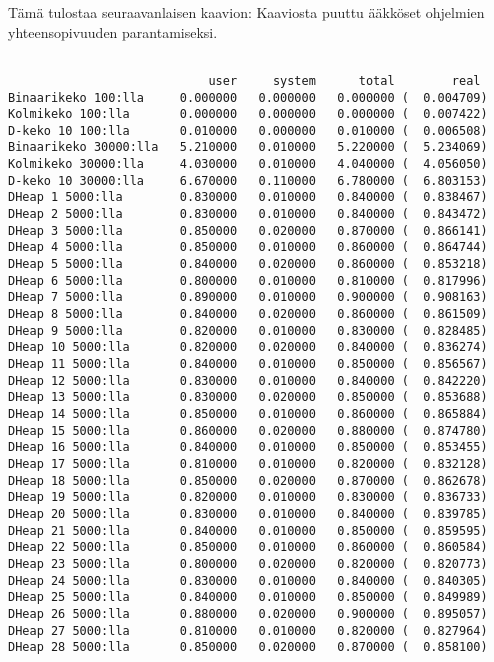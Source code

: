 \documentclass[a4paper,12pt]{article}
\begin{document}
Tämä tulostaa seuraavanlaisen kaavion:
Kaaviosta puuttu ääkköset ohjelmien yhteensopivuuden parantamiseksi.
\newpage
\scriptsize
\begin{verbatim}

                            user     system      total        real
Binaarikeko 100:lla     0.000000   0.000000   0.000000 (  0.004709)
Kolmikeko 100:lla       0.000000   0.000000   0.000000 (  0.007422)
D-keko 10 100:lla       0.010000   0.000000   0.010000 (  0.006508)
Binaarikeko 30000:lla   5.210000   0.010000   5.220000 (  5.234069)
Kolmikeko 30000:lla     4.030000   0.010000   4.040000 (  4.056050)
D-keko 10 30000:lla     6.670000   0.110000   6.780000 (  6.803153)
DHeap 1 5000:lla        0.830000   0.010000   0.840000 (  0.838467)
DHeap 2 5000:lla        0.830000   0.010000   0.840000 (  0.843472)
DHeap 3 5000:lla        0.850000   0.020000   0.870000 (  0.866141)
DHeap 4 5000:lla        0.850000   0.010000   0.860000 (  0.864744)
DHeap 5 5000:lla        0.840000   0.020000   0.860000 (  0.853218)
DHeap 6 5000:lla        0.800000   0.010000   0.810000 (  0.817996)
DHeap 7 5000:lla        0.890000   0.010000   0.900000 (  0.908163)
DHeap 8 5000:lla        0.840000   0.020000   0.860000 (  0.861509)
DHeap 9 5000:lla        0.820000   0.010000   0.830000 (  0.828485)
DHeap 10 5000:lla       0.820000   0.020000   0.840000 (  0.836274)
DHeap 11 5000:lla       0.840000   0.010000   0.850000 (  0.856567)
DHeap 12 5000:lla       0.830000   0.010000   0.840000 (  0.842220)
DHeap 13 5000:lla       0.830000   0.020000   0.850000 (  0.853688)
DHeap 14 5000:lla       0.850000   0.010000   0.860000 (  0.865884)
DHeap 15 5000:lla       0.860000   0.020000   0.880000 (  0.874780)
DHeap 16 5000:lla       0.840000   0.010000   0.850000 (  0.853455)
DHeap 17 5000:lla       0.810000   0.010000   0.820000 (  0.832128)
DHeap 18 5000:lla       0.850000   0.020000   0.870000 (  0.862678)
DHeap 19 5000:lla       0.820000   0.010000   0.830000 (  0.836733)
DHeap 20 5000:lla       0.830000   0.010000   0.840000 (  0.839785)
DHeap 21 5000:lla       0.840000   0.010000   0.850000 (  0.859595)
DHeap 22 5000:lla       0.850000   0.010000   0.860000 (  0.860584)
DHeap 23 5000:lla       0.800000   0.020000   0.820000 (  0.820773)
DHeap 24 5000:lla       0.830000   0.010000   0.840000 (  0.840305)
DHeap 25 5000:lla       0.840000   0.010000   0.850000 (  0.849989)
DHeap 26 5000:lla       0.880000   0.020000   0.900000 (  0.895057)
DHeap 27 5000:lla       0.810000   0.010000   0.820000 (  0.827964)
DHeap 28 5000:lla       0.850000   0.020000   0.870000 (  0.858100)

\end{verbatim}
\end{document}
